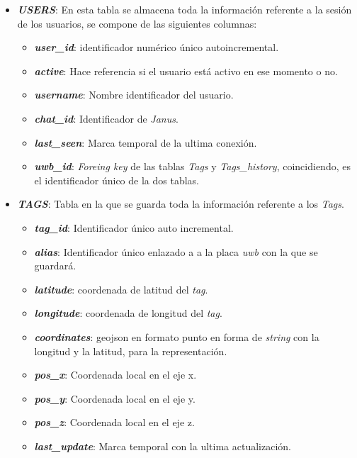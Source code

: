 \begin{itemize}
    \item \textit{\textbf{USERS}}: En esta tabla se almacena toda la información referente a la sesión de los usuarios, se compone de las siguientes columnas:
        \begin{itemize}
            \item\textit{\textbf{user\_id}}: identificador numérico único autoincremental.
            \item \textit{\textbf{active}}: Hace referencia si el usuario está activo en ese momento o no.
            \item \textit{\textbf{username}}: Nombre identificador del usuario.
            \item \textit{\textbf{chat\_id}}: Identificador de \textit{Janus}.
            \item \textit{\textbf{last\_seen}}: Marca temporal de la ultima conexión.
            \item \textit{\textbf{uwb\_id}}: \textit{Foreing key} de las tablas \textit{Tags} y \textit{Tags\_history}, coincidiendo, es el identificador único de la dos tablas.
        \end{itemize}
    \item \textit{\textbf{TAGS}}: Tabla en la que se guarda toda la información referente a los \textit{Tags}.
            \begin{itemize}
                \item \textit{\textbf{tag\_id}}: Identificador único auto incremental.
                \item \textit{\textbf{alias}}: Identificador único enlazado a a la placa \textit{uwb} con la que se guardará.
                \item \textit{\textbf{latitude}}: coordenada de latitud del \textit{tag}.
                \item \textit{\textbf{longitude}}: coordenada de longitud del \textit{tag}.
                \item \textit{\textbf{coordinates}}: geojson en formato punto en forma de \textit{string} con la longitud y la latitud, para la representación.
                \item \textit{\textbf{pos\_x}}: Coordenada local en el eje x.
                \item \textit{\textbf{pos\_y}}: Coordenada local en el eje y.
                \item \textit{\textbf{pos\_z}}: Coordenada local en el eje z.
                \item \textit{\textbf{last\_update}}: Marca temporal con la ultima actualización.

\end{itemize}
\end{itemize}
